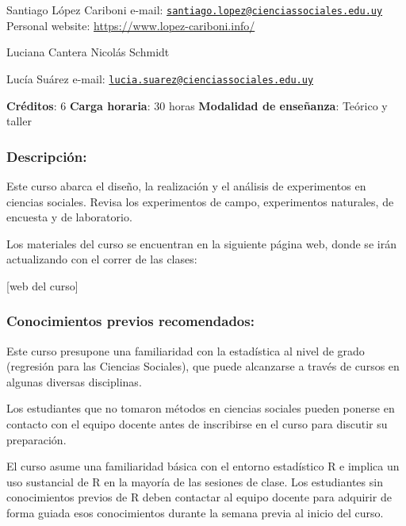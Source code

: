 \documentclass[
  12pt,
]{article}
\begin{document}
Santiago López Cariboni \newline e-mail:
\href{mailto:santiago.lopez@cienciassociales.edu.uy}{\nolinkurl{santiago.lopez@cienciassociales.edu.uy}}
\newline Personal website: \url{https://www.lopez-cariboni.info/}

Luciana Cantera \newline Nicolás Schmidt \newline

Lucía Suárez \newline e-mail:
\href{mailto:lucia.suarez@cienciassociales.edu.uy}{\nolinkurl{lucia.suarez@cienciassociales.edu.uy}}

\textbf{Créditos}: 6 \newline \textbf{Carga horaria}: 30 horas \newline
\textbf{Modalidad de enseñanza}: Teórico y taller

\hypertarget{descripciuxf3n-1}{%
\subsubsection{Descripción:}\label{descripciuxf3n-1}}

Este curso abarca el diseño, la realización y el análisis de
experimentos en ciencias sociales. Revisa los experimentos de campo,
experimentos naturales, de encuesta y de laboratorio.

Los materiales del curso se encuentran en la siguiente página web, donde
se irán actualizando con el correr de las clases:

{[}web del curso{]}

\hypertarget{conocimientos-previos-recomendados-1}{%
\subsubsection{Conocimientos previos
recomendados:}\label{conocimientos-previos-recomendados-1}}

Este curso presupone una familiaridad con la estadística al nivel de
grado (regresión para las Ciencias Sociales), que puede alcanzarse a
través de cursos en algunas diversas disciplinas.

Los estudiantes que no tomaron métodos en ciencias sociales pueden
ponerse en contacto con el equipo docente antes de inscribirse en el
curso para discutir su preparación.

El curso asume una familiaridad básica con el entorno estadístico R e
implica un uso sustancial de R en la mayoría de las sesiones de clase.
Los estudiantes sin conocimientos previos de R deben contactar al equipo
docente para adquirir de forma guiada esos conocimientos durante la
semana previa al inicio del curso.
\end{document}
